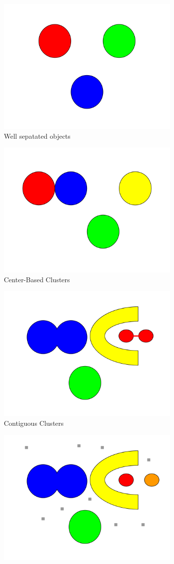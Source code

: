 \begin{figure}[h]
\centering
\begin{subfigure}{.5\textwidth}
  \centering
  \includegraphics[width=.5\linewidth]{img/wellSeparatedObjects.png}
  \caption{Well sepatated objects}
  \label{fig:wellSeparatedObjects}
\end{subfigure}%
\begin{subfigure}{.5\textwidth}
  \centering
  \includegraphics[width=.5\linewidth]{img/centerBasedClusters.png}
  \caption{Center-Based Clusters}
  \label{fig:centerBasedClusters}
\end{subfigure}%
\vspace*{0.5cm} 
\begin{subfigure}{.5\textwidth}
  \centering
  \includegraphics[width=.5\linewidth]{img/contiguousClusters.png}
  \caption{Contiguous Clusters}
  \label{fig:contiguousClusters}
\end{subfigure}%
\begin{subfigure}{.5\textwidth}
  \centering
  \includegraphics[width=.5\linewidth]{img/densityClusters.png}

\end{subfigure}
\end{figure}
